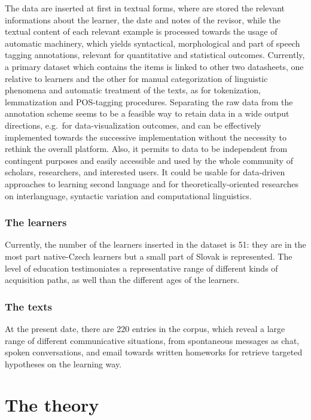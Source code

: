 \documentclass[a4paper,twoside,11pt,chapterprefix=true,listof=totocnumbered,bibliography=totocnumbered]{scrbook}
\theoremstyle{definition}
\theoremstyle{definition}
\theoremstyle{definition}
\theoremstyle{remark}
\begin{document}
The data are inserted at first in textual forms, where are stored the
relevant informations about the learner, the date and notes of the
revisor, while the textual content of each relevant example is processed
towards the usage of automatic machinery, which yields syntactical,
morphological and part of speech tagging annotations, relevant for
quantitative and statistical outcomes. Currently, a primary dataset
which contains the items is linked to other two datasheets, one relative
to learners and the other for manual categorization of linguistic
phenomena and automatic treatment of the texts, as for tokenization,
lemmatization and POS-tagging procedures. Separating the raw data from
the annotation scheme seems to be a feasible way to retain data in a
wide output directions, e.g.~for data-visualization outcomes, and can be
effectively implemented towards the successive implementation without
the necessity to rethink the overall platform. Also, it permits to data
to be independent from contingent purposes and easily accessible and
used by the whole community of scholars, researchers, and interested
users. It could be usable for data-driven approaches to learning second
language and for theoretically-oriented researches on interlanguage,
syntactic variation and computational linguistics.

\subsubsection{The learners}\label{the-learners}

Currently, the number of the learners inserted in the dataset is 51:
they are in the most part native-Czech learners but a small part of
Slovak is represented. The level of education testimoniates a
representative range of different kinds of acquisition paths, as well
than the different ages of the learners.

\subsubsection{The texts}\label{the-texts}

At the present date, there are 220 entries in the corpus, which reveal a
large range of different communicative situations, from spontaneous
messages as chat, spoken conversations, and email towards written
homeworks for retrieve targeted hypotheses on the learning way.

\section{The theory}\label{the-theory}
\end{document}
